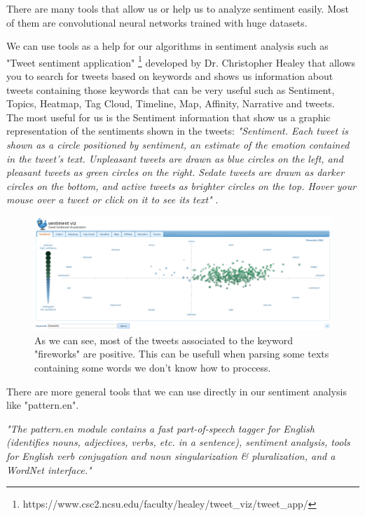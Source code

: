 \documentclass[12pt,twoside]{article}
\theoremstyle{plain}
\theoremstyle{definition}
\theoremstyle{remark}
\begin{document}
		There are many tools that allow us or help us to analyze sentiment easily. Most of them are convolutional neural networks trained with huge datasets.
		
		We can use tools as a help for our algorithms in sentiment analysis such as "Tweet sentiment application" \footnote{https://www.csc2.ncsu.edu/faculty/healey/tweet\_viz/tweet\_app/} developed by Dr. Christopher Healey that allows you to search for tweets based on keywords and shows us information about tweets containing those keywords that can be very useful such as Sentiment, Topics, Heatmap, Tag Cloud, Timeline, Map, Affinity, Narrative and tweets. \\
		
		The most useful for us is the Sentiment information that show us a graphic representation of the sentiments shown in the tweets: \textit{"Sentiment. Each tweet is shown as a circle positioned by sentiment, an estimate of the emotion contained in the tweet's text. Unpleasant tweets are drawn as blue circles on the left, and pleasant tweets as green circles on the right. Sedate tweets are drawn as darker circles on the bottom, and active tweets as brighter circles on the top. Hover your mouse over a tweet or click on it to see its text"} \cite{tweet_sentiment_analysis}.
			
		\begin{figure}[h]
			\centering
			\includegraphics[scale=0.35]{./Pictures/fireworks_sentiment_visualization.png}
			\caption{As we can see, most of the tweets associated to the keyword "fireworks" are positive. This can be usefull when parsing some texts containing some words we don't know how to proccess.} 
		\end{figure}
	
		There are more general tools that we can use directly in our sentiment analysis like "pattern.en".
		
		\textit{"The pattern.en module contains a fast part-of-speech tagger for English (identifies nouns, adjectives, verbs, etc. in a sentence), sentiment analysis, tools for English verb conjugation and noun singularization \& pluralization, and a WordNet interface."} \cite{python_module}
		
\end{document}
